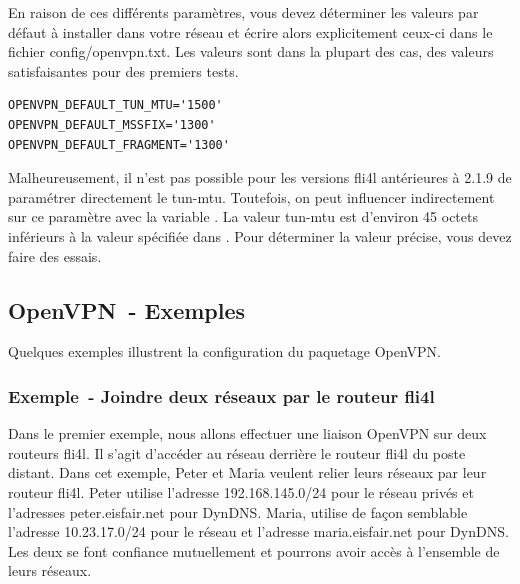 En raison de ces différents paramètres, vous devez déterminer les valeurs par
défaut à installer dans votre réseau et écrire alors explicitement ceux-ci
dans le fichier config/openvpn.txt. Les valeurs sont dans la plupart des cas,
des valeurs satisfaisantes pour des premiers tests.

\begin{example}
\begin{verbatim}
OPENVPN_DEFAULT_TUN_MTU='1500'
OPENVPN_DEFAULT_MSSFIX='1300'
OPENVPN_DEFAULT_FRAGMENT='1300'
\end{verbatim}
\end{example}

Malheureusement, il n'est pas possible pour les versions fli4l antérieures à 2.1.9
de paramétrer directement le \flqq{}tun-mtu\frqq{}. Toutefois, on peut influencer
indirectement sur ce paramètre avec la variable . La valeur
tun-mtu est d'environ 45 octets inférieurs à la valeur spécifiée dans
. Pour déterminer la valeur précise, vous devez faire des essais.


\subsection{OpenVPN~- Exemples}

Quelques exemples illustrent la configuration du paquetage OpenVPN.

\subsubsection{Exemple~- Joindre deux réseaux par le routeur fli4l}

Dans le premier exemple, nous allons effectuer une liaison OpenVPN sur deux
routeurs fli4l. Il s'agit d'accéder au réseau derrière le routeur fli4l du poste
distant. Dans cet exemple, Peter et Maria veulent relier leurs réseaux par leur
routeur fli4l. Peter utilise l'adresse 192.168.145.0/24 pour le réseau privés
et l'adresses peter.eisfair.net pour DynDNS. Maria, utilise de façon
semblable l'adresse 10.23.17.0/24 pour le réseau et l'adresse maria.eisfair.net
pour DynDNS. Les deux se font confiance mutuellement et pourrons avoir accès à
l'ensemble de leurs réseaux.

